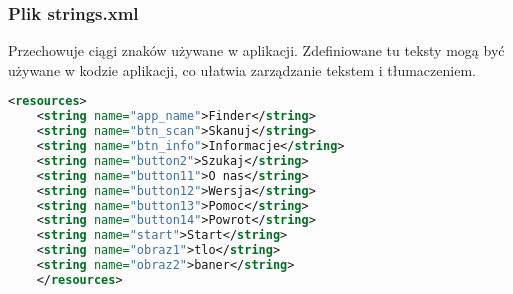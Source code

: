 \subsubsection{Plik strings.xml}
\hspace{0.60 cm} Przechowuje ciągi znaków używane w aplikacji. Zdefiniowane tu teksty mogą być używane w kodzie aplikacji, co ułatwia zarządzanie tekstem i tłumaczeniem.
\begin{lstlisting}[caption=strings.xml, label={lst:kod.xml}, language=XML]
	<resources>
	<string name="app_name">Finder</string>
	<string name="btn_scan">Skanuj</string>
	<string name="btn_info">Informacje</string>
	<string name="button2">Szukaj</string>
	<string name="button11">O nas</string>
	<string name="button12">Wersja</string>
	<string name="button13">Pomoc</string>
	<string name="button14">Powrot</string>
	<string name="start">Start</string>
	<string name="obraz1">tlo</string>
	<string name="obraz2">baner</string>
	</resources>
\end{lstlisting}
